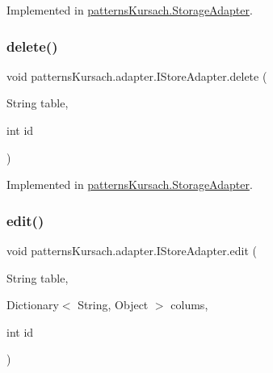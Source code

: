 Implemented in \mbox{\hyperlink{classpatterns_kursach_1_1_storage_adapter_a45d79830f42e8ba2341425175559b31b}{patterns\+Kursach.\+Storage\+Adapter}}.

\mbox{\label{interfacepatterns_kursach_1_1adapter_1_1_i_store_adapter_a938d47744137644c9da0e8d745823238}} 
\subsubsection{\texorpdfstring{delete()}{delete()}}
{\footnotesize\ttfamily void patterns\+Kursach.\+adapter.\+I\+Store\+Adapter.\+delete (\begin{DoxyParamCaption}\item[{String}]{table,  }\item[{int}]{id }\end{DoxyParamCaption})}



Implemented in \mbox{\hyperlink{classpatterns_kursach_1_1_storage_adapter_a6c87c580a8bdc3e2803ae31e59ad0071}{patterns\+Kursach.\+Storage\+Adapter}}.

\mbox{\label{interfacepatterns_kursach_1_1adapter_1_1_i_store_adapter_a68e63038dd5b807330386f8ac774896a}} 
\subsubsection{\texorpdfstring{edit()}{edit()}}
{\footnotesize\ttfamily void patterns\+Kursach.\+adapter.\+I\+Store\+Adapter.\+edit (\begin{DoxyParamCaption}\item[{String}]{table,  }\item[{Dictionary$<$ String, Object $>$}]{colums,  }\item[{int}]{id }\end{DoxyParamCaption})}



